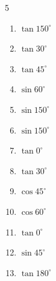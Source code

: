 \begin{multicols}{5}
\begin{enumerate}
  \item $\displaystyle \tan{150^\circ}$


  \item $\displaystyle \tan{30^\circ}$


  \item $\displaystyle \tan{45^\circ}$

        \phantom{$\displaystyle =1$}

  \item $\displaystyle \sin{60^\circ}$


  \item $\displaystyle \sin{150^\circ}$


  \item $\displaystyle \sin{150^\circ}$


  \item $\displaystyle \tan{0^\circ}$

        \phantom{$\displaystyle =0$}

  \item $\displaystyle \tan{30^\circ}$


  \item $\displaystyle \cos{45^\circ}$


  \item $\displaystyle \cos{60^\circ}$


\columnbreak %

  \item $\displaystyle \tan{0^\circ}$

        \phantom{$\displaystyle =0$}

  \item $\displaystyle \sin{45^\circ}$


  \item $\displaystyle \tan{180^\circ}$


\end{enumerate}
\end{multicols}

